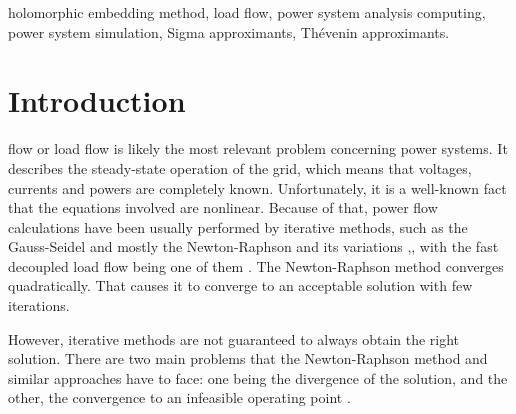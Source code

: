 \documentclass[journal]{IEEEtran}
\begin{document}
\begin{IEEEkeywords}
holomorphic embedding method, load flow, power system analysis computing, power system simulation, Sigma approximants, Thévenin approximants.
\end{IEEEkeywords}






%
\IEEEpeerreviewmaketitle



\section{Introduction}
% 
% 
% 
% 
 flow or load flow is likely the most relevant problem concerning power systems. It describes the steady-state operation of the grid, which means that voltages, currents and powers are completely known. Unfortunately, it is a well-known fact that the equations involved are nonlinear.
Because of that, power flow calculations have been usually performed by iterative methods, such as the Gauss-Seidel and mostly the Newton-Raphson and its variations \cite{Novel},\cite{gomez}, with the fast decoupled load flow being one of them \cite{Stott}. The Newton-Raphson method converges quadratically. That causes it to converge to an acceptable solution with few iterations.

However, iterative methods are not guaranteed to always obtain the right solution. There are two main problems that the Newton-Raphson method and similar approaches have to face: one being the divergence of the solution, and the other, the convergence to an infeasible operating point \cite{Novel}. 
\end{document}
